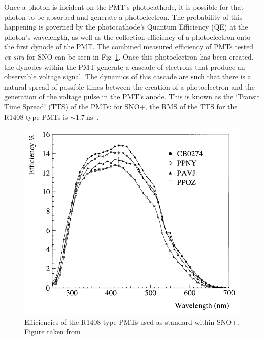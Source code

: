 Once a photon is incident on the PMT's photocathode, it is possible for that photon to be absorbed and generate a photoelectron. The probability of this happening is governed by the photocathode's Quantum Efficiency (QE) at the photon's wavelength, as well as the collection efficiency of a photoelectron onto the first dynode of the PMT. The combined measured efficiency of PMTs tested \textit{ex-situ} for SNO can be seen in Fig~\ref{fig:qe_pmts}. Once this photoelectron has been created, the dynodes within the PMT generate a cascade of electrons that produce an observable voltage signal. The dynamics of this cascade are such that there is a natural spread of possible times between the creation of a photoelectron and the generation of the voltage pulse in the PMT's anode. This is known as the `Transit Time Spread' (TTS) of the PMTs: for SNO+, the RMS of the TTS for the R1408-type PMTs is $\sim\SI{1.7}{\ns}$~\cite{BOGER2000172}. %

\begin{figure}
    \centering
    \includegraphics[width=0.8\linewidth]{2_Detector/Figs/efficiencies_PMTs_biller1999.png}
    \caption[Efficiencies of the R1408-type PMTs used as standard within SNO+]{Efficiencies of the R1408-type PMTs used as standard within SNO+. Figure taken from~\cite{billerMeasurementsPhotomultiplierSingle1999}. %
    }
    \label{fig:qe_pmts}
\end{figure}

